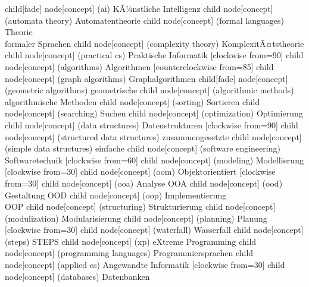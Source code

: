 \documentclass[german,landscape]{article}
\begin{document}
\begin{map}
\begin{scope}[a0 mindmap]
{{      child[fade] { node[concept] (ai)                  {KÃ¼nstliche Intelligenz}  }
      child { node[concept] (automata theory)           {Automaten\-theorie}      }
      child { node[concept] (formal languages)       {Theorie\\formaler Sprachen} }
      child { node[concept] (complexity theory)      {KomplexitÃ¤ts\-theorie}      }
    }
    child { node[concept] (practical cs)     {Praktische Informatik}
      [clockwise from=90]
      child { node[concept] (algorithms)          {Algo\-rithmen}
        [counterclockwise from=85]
        child       { node[concept] (graph algorithms)     {Graph\-algorithmen}         }
        child[fade] { node[concept] (geometric algorithms) {geo\-metrische}             }
        child       { node[concept] (algorithmic methods)  {algorith\-mische Methoden}  }
        child 		{ node[concept] (sorting)              {Sortieren}     		}
        child 		{ node[concept] (searching)            {Suchen}        		}
        child 		{ node[concept] (optimization)         {Opti\-mierung} 		}
      }
      child { node[concept] (data structures)     {Daten\-strukturen}
        [clockwise from=90]
        child { node[concept] (structured data structures) {zusammen\-gesetzte} 	}
        child { node[concept] (simple data structures) {einfache}			}
      }
      child { node[concept] (software engineering) {Software\-technik}
        [clockwise from=60]
        child       { node[concept] (modeling)     {Model\-lierung} 
          [clockwise from=30]
          child       { node[concept] (oom)     {Objekt\-orientiert}
            [clockwise from=30]
            child  { node[concept] (ooa)     {Analyse OOA}            }
            child  { node[concept] (ood)     {Gestal\-tung OOD}       }
            child  { node[concept] (oop)     {Implemen\-tierung\\OOP} }
          }
        }
        child       { node[concept] (structuring)  {Struktu\-rierung}  }
        child       { node[concept] (modulization) {Modulari\-sierung} }
        child       { node[concept] (planning)     {Planung} 
          [clockwise from=30]
          child {node[concept] (waterfall) {Wasserfall}          }
          child {node[concept] (steps)     {STEPS} 		 }
          child {node[concept] (xp)        {eXtreme Programming} }
        }
      }
      child { node[concept] (programming languages) {Pro\-grammier\-sprachen}
      }
    }
    child { node[concept] (applied cs) {Angewandte Informatik}
      [clockwise from=30]
      child { node[concept] (databases) {Daten\-banken}       }
}}
\end{scope}
\end{map}
\end{document}
